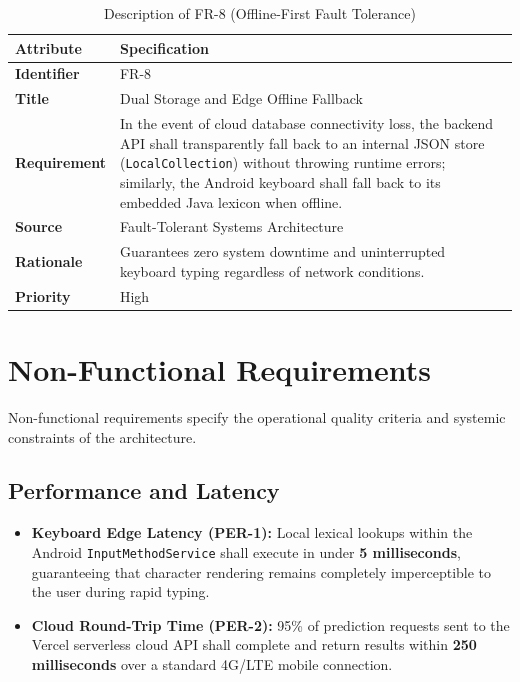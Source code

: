 \documentclass[A4paper,12pt]{report}
\theoremstyle{plain}
\theoremstyle{definition}
\theoremstyle{remark}
\numberwithin{equation}{section}
\begin{document}
\begin{table}[H]
\centering
\caption{Description of FR-8 (Offline-First Fault Tolerance)}
\renewcommand{\arraystretch}{1.3}
\begin{tabular}{|p{3.5cm}|p{10.5cm}|}
\hline
\textbf{Attribute} & \textbf{Specification} \\ \hline
\textbf{Identifier} & FR-8 \\ \hline
\textbf{Title} & Dual Storage and Edge Offline Fallback \\ \hline
\textbf{Requirement} & In the event of cloud database connectivity loss, the backend API shall transparently fall back to an internal JSON store (\texttt{LocalCollection}) without throwing runtime errors; similarly, the Android keyboard shall fall back to its embedded Java lexicon when offline. \\ \hline
\textbf{Source} & Fault-Tolerant Systems Architecture \\ \hline
\textbf{Rationale} & Guarantees zero system downtime and uninterrupted keyboard typing regardless of network conditions. \\ \hline
\textbf{Priority} & High \\ \hline
\end{tabular}
\end{table}

\section{Non-Functional Requirements}
Non-functional requirements specify the operational quality criteria and systemic constraints of the architecture.

\subsection{Performance and Latency}
\begin{itemize}[leftmargin=*]
    \item \textbf{Keyboard Edge Latency (PER-1):} Local lexical lookups within the Android \texttt{InputMethodService} shall execute in under \textbf{5 milliseconds}, guaranteeing that character rendering remains completely imperceptible to the user during rapid typing.
    \item \textbf{Cloud Round-Trip Time (PER-2):} 95\% of prediction requests sent to the Vercel serverless cloud API shall complete and return results within \textbf{250 milliseconds} over a standard 4G/LTE mobile connection.
\end{itemize}
\end{document}

